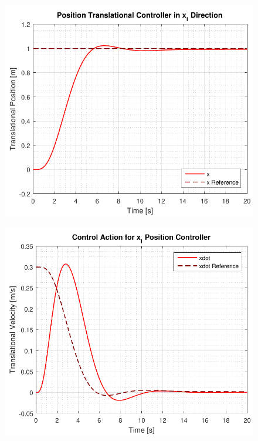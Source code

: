 \begin{minipage}{\linewidth}
    \begin{minipage}{0.46\linewidth}
        \begin{figure}[H]
            \includegraphics[scale=.6]{figures/positionControllersXY}
            \centering			
            \label{fig:positionControllersXY}
        \end{figure}
    \end{minipage}
    \hspace{0.03\linewidth}
    \begin{minipage}{0.46\linewidth}
        \begin{figure}[H]
            \includegraphics[scale=.6]{figures/positionControllersXYAction}

\end{figure}
\end{minipage}
\end{minipage}
